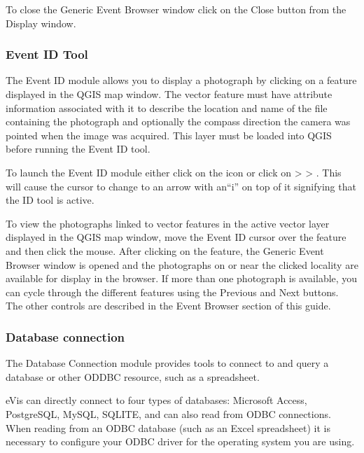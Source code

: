 To close the Generic Event Browser window click on the Close button from the Display window.

\subsubsection{Event ID Tool}\label{evis_id_tool}

The Event ID module allows you to display a photograph by clicking on a feature displayed in the
QGIS map window. The vector feature must have attribute information associated with it to describe
the location and name of the file containing the photograph and optionally the compass direction the
camera was pointed when the image was acquired. This layer must be loaded into QGIS before running
the Event ID tool.

\label{evis_launch_id}

To launch the Event ID module either click on the 
icon or click on  >  >
. This will cause the cursor to change to an arrow with an``i'' on top of
it signifying that the ID tool is active.

To view the photographs linked to vector features in the active vector layer displayed in the QGIS
map window, move the Event ID cursor over the feature and then click the mouse. After clicking on
the feature, the Generic Event Browser window is opened and the photographs on or near the clicked
locality are available for display in the browser. If more than one photograph is available, you can
cycle through the different features using the Previous and Next buttons. The other controls are
described in the Event Browser section of this guide.

\subsubsection{Database connection}\label{evis_database}

The Database Connection module provides tools to connect to and query a database or other ODDBC
resource, such as a spreadsheet.

eVis can directly connect to four types of databases: Microsoft Access, PostgreSQL, MySQL, SQLITE,
and can also read from ODBC connections. When reading from an ODBC database (such as an Excel
spreadsheet) it is necessary to configure your ODBC driver for the operating system you are using.


